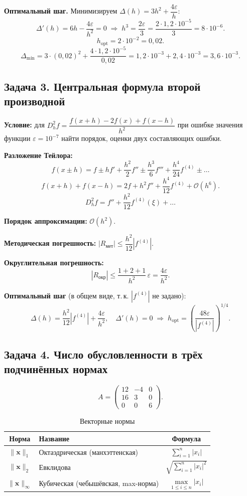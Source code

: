 \documentclass{article}
\begin{document}
\textbf{Оптимальный шаг.} Минимизируем $\Delta(h) = 3h^2 + \dfrac{4\varepsilon}{h}$:
$$\Delta'(h) = 6h - \frac{4\varepsilon}{h^2} = 0 \;\Rightarrow\; h^3 = \frac{2\varepsilon}{3} = \frac{2\cdot 1{,}2\cdot 10^{-5}}{3} = 8\cdot 10^{-6}.$$
$$\boxed{h_{\text{opt}} = 2\cdot 10^{-2} = 0{,}02.}$$
$$\Delta_{\min} = 3\cdot(0{,}02)^2 + \frac{4\cdot 1{,}2\cdot 10^{-5}}{0{,}02} = 1{,}2\cdot 10^{-3} + 2{,}4\cdot 10^{-3} = 3{,}6\cdot 10^{-3}.$$


\subsection*{Задача 3. Центральная формула второй производной}
\textbf{Условие:} для $D_h^2 f = \dfrac{f(x+h)-2f(x)+f(x-h)}{h^2}$ при ошибке значения функции $\varepsilon = 10^{-7}$ найти порядок, оценки двух составляющих ошибки.

\textbf{Разложение Тейлора:}
$$f(x\pm h) = f \pm hf' + \frac{h^2}{2}f'' \pm \frac{h^3}{6}f''' + \frac{h^4}{24}f^{(4)} \pm \dots$$
$$f(x+h)+f(x-h) = 2f + h^2 f'' + \frac{h^4}{12}f^{(4)} + \mathcal{O}(h^6).$$
$$D_h^2 f = f'' + \frac{h^2}{12}f^{(4)}(\xi) + \dots$$

\textbf{Порядок аппроксимации:} $\mathcal{O}(h^2)$.

\textbf{Методическая погрешность:} $|R_{\text{мет}}| \le \dfrac{h^2}{12}|f^{(4)}|$.

\textbf{Округлительная погрешность:}
$$|R_{\text{окр}}| \le \frac{1+2+1}{h^2}\,\varepsilon = \frac{4\varepsilon}{h^2}.$$

\textbf{Оптимальный шаг} (в общем виде, т.\,к. $|f^{(4)}|$ не задано):
$$\Delta(h) = \frac{h^2}{12}|f^{(4)}| + \frac{4\varepsilon}{h^2}, \quad \Delta'(h)=0 \;\Rightarrow\; h_{\text{opt}} = \left(\frac{48\varepsilon}{|f^{(4)}|}\right)^{1/4}.$$


\subsection*{Задача 4. Число обусловленности в трёх подчинённых нормах}
$$A = \begin{pmatrix} 12 & -4 & 0 \\ 16 & 3 & 0 \\ 0 & 0 & 6 \end{pmatrix}.$$

\begin{table}[h!]
\centering
\caption{Векторные нормы}
\begin{tabular}{clc}
\hline
\textbf{Норма} & \textbf{Название} & \textbf{Формула} \\
\hline
$\|\mathbf{x}\|_1$ & Октаэдрическая (манхэттенская) & $\sum_{i=1}^n |x_i|$ \\
$\|\mathbf{x}\|_2$ & Евклидова & $\sqrt{\sum_{i=1}^n |x_i|^2}$ \\
$\|\mathbf{x}\|_\infty$ & Кубическая (чебышёвская, max-норма) & $\max\limits_{1 \leq i \leq n} |x_i|$ \\
\hline
\end{tabular}
\end{table}
\end{document}
